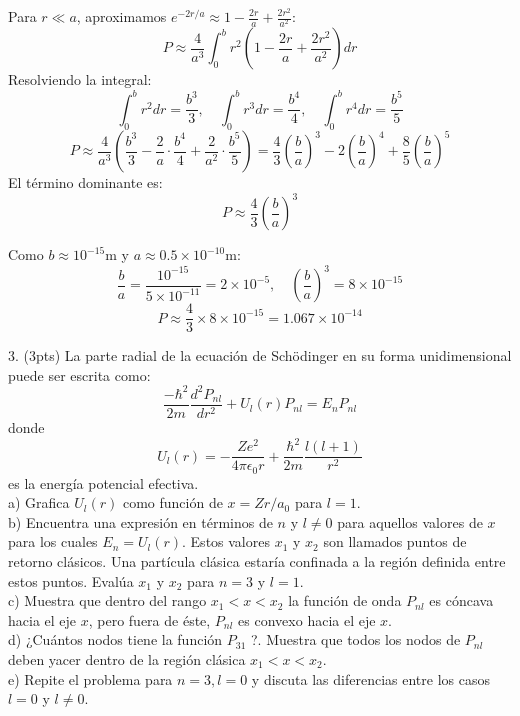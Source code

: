 \documentclass{article}
\theoremstyle{nonumberplain}
\begin{document}
   Para \( r \ll a \), aproximamos \( e^{-2r/a} \approx 1 - \frac{2r}{a} + \frac{2r^2}{a^2} \):
   \[
   P \approx \frac{4}{a^3} \int_0^b r^2 \left( 1 - \frac{2r}{a} + \frac{2r^2}{a^2} \right) dr
   \]
   Resolviendo la integral:
   \[
   \int_0^b r^2  dr = \frac{b^3}{3}, \quad \int_0^b r^3  dr = \frac{b^4}{4}, \quad \int_0^b r^4  dr = \frac{b^5}{5}
   \]
   \[
   P \approx \frac{4}{a^3} \left( \frac{b^3}{3} - \frac{2}{a} \cdot \frac{b^4}{4} + \frac{2}{a^2} \cdot \frac{b^5}{5} \right) = \frac{4}{3} \left( \frac{b}{a} \right)^3 - 2 \left( \frac{b}{a} \right)^4 + \frac{8}{5} \left( \frac{b}{a} \right)^5
   \]
   El término dominante es:
   \[
   P \approx \dfrac{4}{3} \left( \dfrac{b}{a} \right)^3
   \]

Como \( b \approx 10^{-15}  \text{m} \) y \( a \approx 0.5 \times 10^{-10}  \text{m} \):
   \[
   \frac{b}{a} = \frac{10^{-15}}{5 \times 10^{-11}} = 2 \times 10^{-5}, \quad \left( \frac{b}{a} \right)^3 = 8 \times 10^{-15}
   \]
   \[
   P \approx \frac{4}{3} \times 8 \times 10^{-15} = 1.067 \times 10^{-14}
   \]


3. (3pts) La parte radial de la ecuación de Schödinger en su forma unidimensional puede ser escrita como:
\[
\frac{-\hbar^{2}}{2 m} \frac{d^{2} P_{n l}}{d r^{2}}+U_{l}(r) P_{n l}=E_{n} P_{n l}
\]
donde
\[
U_{l}(r)=-\frac{Z e^{2}}{4 \pi \epsilon_{0} r}+\frac{\hbar^{2}}{2 m} \frac{l(l+1)}{r^{2}}
\]
es la energía potencial efectiva.\\
a) Grafica \( U_{l}(r) \) como función de \( x=Z r / a_{0} \) para \( l=1 \).\\
b) Encuentra una expresión en términos de \( n \) y \( l \neq 0 \) para aquellos valores de \( x \) para los cuales \( E_{n}=U_{l}(r) \). Estos valores \( x_{1} \) y \( x_{2} \) son llamados puntos de retorno clásicos. Una partícula clásica estaría confinada a la región definida entre estos puntos. Evalúa \( x_{1} \) y \( x_{2} \) para \( n=3 \) y \( l=1 \).\\
c) Muestra que dentro del rango \( x_{1}<x<x_{2} \) la función de onda \( P_{n l} \) es cóncava hacia el eje \( x \), pero fuera de éste, \( P_{n l} \) es convexo hacia el eje \( x \).\\
d) ¿Cuántos nodos tiene la función \( P_{31} \) ?. Muestra que todos los nodos de \( P_{n l} \) deben yacer dentro de la región clásica \( x_{1}<x<x_{2} \).\\
e) Repite el problema para \( n=3, l=0 \) y discuta las diferencias entre los casos \( l=0 \) y \( l \neq 0 \).\\
\end{document}
